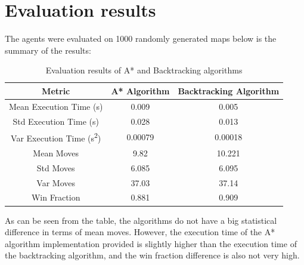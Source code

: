 \documentclass[12pt]{article}
\begin{document}
\section{Evaluation results}
The agents were evaluated on 1000 randomly generated maps below is the summary
of the results:
\begin{table}[H]
    \centering
    \begin{tabular}{|c|c|c|}
        \hline
        \textbf{Metric}                           & \textbf{A* Algorithm} & \textbf{Backtracking Algorithm} \\ \hline
        Mean Execution Time (s)                   & 0.009                 & 0.005                           \\ \hline
        Std Execution Time (s)                    & 0.028                 & 0.013                           \\ \hline
        Var Execution Time (s\textsuperscript{2}) & 0.00079               & 0.00018                         \\ \hline
        Mean Moves                                & 9.82                  & 10.221                          \\ \hline
        Std Moves                                 & 6.085                 & 6.095                           \\ \hline
        Var Moves                                 & 37.03                 & 37.14                           \\ \hline
        Win Fraction                              & 0.881                 & 0.909                           \\ \hline
    \end{tabular}
    \caption{Evaluation results of A* and Backtracking algorithms}
    \label{tab:evaluation_results}
\end{table}
\noindent
As can be seen from the table, the algorithms do not have a big
statistical difference in terms of mean moves. However, the execution time of the A* algorithm implementation provided is slightly higher than the execution time of the backtracking algorithm, and the win fraction difference is also not very high.
\end{document}
